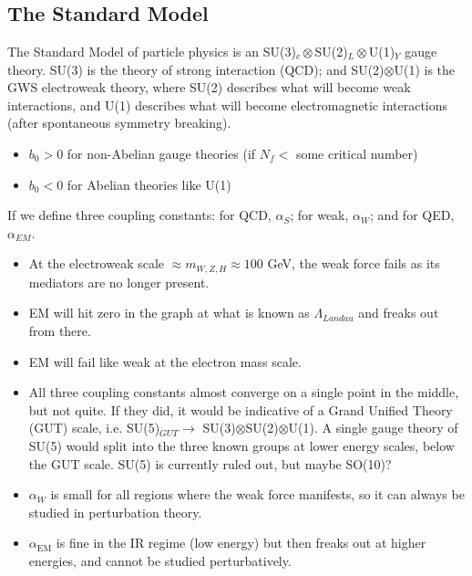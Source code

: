 \documentclass[relqm.tex]{subfiles}
\begin{document}
\chapter{}
\section{The Standard Model}
The Standard Model of particle physics is an SU(3)$_c\otimes$SU(2)$_L\otimes$U(1)$_Y$ gauge theory. 
SU(3) is the theory of strong interaction (QCD); and SU(2)$\otimes$U(1) is the GWS electroweak theory, where SU(2) describes what will become weak interactions, and U(1) describes what will become electromagnetic interactions (after spontaneous symmetry breaking).
\begin{itemize}
    \item $b_0>0$ for non-Abelian gauge theories (if $N_f <$ some critical number)
    \item $b_0<0$ for Abelian theories like U(1)
\end{itemize}
If we define three coupling constants: for QCD, $\alpha_S$; for weak, $\alpha_W$; and for QED, $\alpha_{EM}$.
\begin{figure}[H]
    \centering
\end{figure}
\begin{itemize}
    \item At the electroweak scale $\approx m_{W,Z,H}\approx100$ GeV, the weak force fails as its mediators are no longer present. 
    \item EM will hit zero in the graph at what is known as $\Lambda_{Landau}$ and freaks out from there.
    \item EM will fail like weak at the electron mass scale.
    \item All three coupling constants almost converge on a single point in the middle, but not quite. 
        If they did, it would be indicative of a Grand Unified Theory (GUT) scale, i.e. SU(5)$_{GUT}\to$ SU(3)$\otimes$SU(2)$\otimes$U(1). 
        A single gauge theory of SU(5) would split into the three known groups at lower energy scales, below the GUT scale. 
        SU(5) is currently ruled out, but maybe SO(10)?
    \item $\alpha_W$ is small for all regions where the weak force manifests, so it can always be studied in perturbation theory.
    \item $\alpha_{\text{EM}}$ is fine in the IR regime (low energy) but then freaks out at higher energies, and cannot be studied perturbatively.
\end{itemize}
\end{document}
